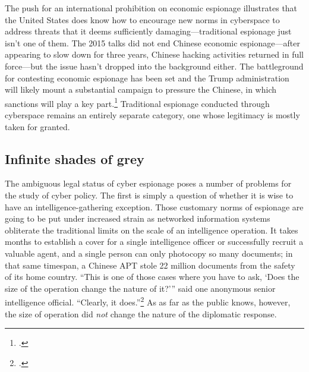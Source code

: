 \documentclass{memoir}
\begin{document}
\begin{refsegment}
The push for an international prohibition on economic espionage illustrates that the United States does know how to encourage new norms in cyberspace to address threats that it deems sufficiently damaging---traditional espionage just isn't one of them.  The 2015 talks did not end Chinese economic espionage---after appearing to slow down for three years, Chinese hacking activities returned in full force---but the issue hasn't dropped into the background either. The battleground for contesting economic espionage has been set and the Trump administration will likely mount a substantial campaign to pressure the Chinese, in which sanctions will play a key part.\footcite{laskai_new_2018} Traditional espionage conducted through cyberspace remains an entirely separate category, one whose legitimacy is mostly taken for granted.

\subsection{Infinite shades of grey}
The ambiguous legal status of cyber espionage poses a number of problems for the study of cyber policy. The first is simply a question of whether it is wise to have an intelligence-gathering exception. Those customary norms of espionage are going to be put under increased strain as networked information systems obliterate the traditional limits on the scale of an intelligence operation. It takes months to establish a cover for a single intelligence officer or successfully recruit a valuable agent, and a single person can only photocopy so many documents; in that same timespan, a Chinese APT stole 22 million documents from the safety of its home country. ``This is one of those cases where you have to ask, `Does the size of the operation change the nature of it?'\thinspace'' said one anonymous senior intelligence official. ``Clearly, it does.''\footcite{sanger_u.s._2015} As as far as the public knows, however, the size of operation did \emph{not} change the nature of the diplomatic response.


\end{refsegment}
\end{document}
